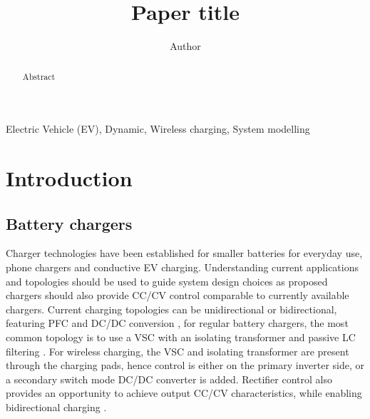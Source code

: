 \documentclass[conference]{IEEEtran}
\begin{document}
	
	\title{Paper title}
	
	\author{
		Author			
	}
	\maketitle
	
\begin{abstract}
	Abstract
\end{abstract}

\begin{IEEEkeywords}
	Electric Vehicle (EV), Dynamic, Wireless charging, System modelling
\end{IEEEkeywords}

\section{Introduction}

\subsection{Battery chargers}
Charger technologies have been established for smaller batteries for everyday use, phone chargers and conductive EV charging. Understanding current applications and topologies should be used to guide system design choices as proposed chargers should also provide CC/CV control comparable to currently available chargers. Current charging topologies can be unidirectional or bidirectional, featuring PFC and DC/DC conversion \cite{charger_1}, for regular battery chargers, the most common topology is to use a VSC with an isolating transformer and passive LC filtering \cite{charger_2,charger_3}. For wireless charging, the VSC and isolating transformer are present through the charging pads, hence control is either on the primary inverter side, or a secondary switch mode DC/DC converter is added\cite{charger_4}. Rectifier control also provides an opportunity to achieve output CC/CV characteristics, while enabling bidirectional charging \cite{charger_5_bidirectional}.
\end{document}
